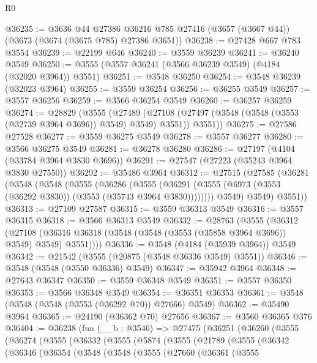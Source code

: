 \begin{lexlean}{R0}
\begin{coremodule}
@36235 := @3636
    @44
    @27386
    @36216
    @785
    @27416
    (@3657 (@3667 @44))
    (@3673 (@3674 (@3675 @785) @27386 @3651))
@36238 := @27428 @667 @783 @3554
@36239 := @22199 @646
@36240 := @3559 @36239
@36241 := @36240 @3549
@36250 := @3555 (@3557 @36241 (@3566 @36239 @3549) (@4184 (@32020 @3964)) @3551)
@36251 := @3548 @36250
@36254 := @3548 @36239 (@32023 @3964)
@36255 := @3559 @36254
@36256 := @36255 @3549
@36257 := @3557 @36256
@36259 := @3566 @36254 @3549
@36260 := @36257 @36259
@36274 := @28829
    (@3555
      (@27489
        (@27108 (@27497 (@3548 (@3548 (@3553 (@32739 @3964 @3696)) @3549) @3549) @3551))
        @3551))
@36275 := @27586 @27528
@36277 := @3559 @36275 @3549
@36278 := @3557 @36277
@36280 := @3566 @36275 @3549
@36281 := @36278 @36280
@36286 := @27197 (@4104 (@33784 @3964 @3830 @3696))
@36291 := @27547 (@27223 (@35243 @3964 @3830 @27550))
@36292 := @35486 @3964
@36312 := @27515
    (@27585
      (@36281
        (@3548
          (@3548
            (@3555
              (@36286
                (@3555
                  (@36291 (@3555 (@6973 (@3553 (@36292 @3830)) (@3553 (@35743 @3964 @3830))))))))
            @3549)
          @3549)
        @3551))
@36313 := @27109 @27587
@36315 := @3559 @36313 @3549
@36316 := @3557 @36315
@36318 := @3566 @36313 @3549
@36332 := @28763
    (@3555
      (@36312
        (@27108 (@36316 @36318 (@3548 (@3548 (@3553 (@35858 @3964 @3696)) @3549) @3549) @3551))))
@36336 := @3548 (@4184 (@35939 @3964)) @3549
@36342 := @21542 (@3555 (@20875 (@3548 @36336 @3549) @3551))
@36346 := @3548 (@3548 (@3550 @36336) @3549)
@36347 := @35942 @3964
@36348 := @27643 @36347
@36350 := @3559 @36348 @3549
@36351 := @3557 @36350
@36353 := @3566 @36348 @3549
@36354 := @36351 @36353
@36361 := @3548 (@3548 (@3548 (@3553 (@36292 @70)) @27666) @3549)
@36362 := @35490 @3964
@36365 := @24190 (@36362 @70) @27656
@36367 := @3560 @36365 @376
@36404 := @36238
    (fun (__b : @3546) =>
    @27475
      (@36251
        (@36260
          (@3555
            (@36274
              (@3555
                (@36332
                  (@3555
                    (@5874
                      (@3555
                        (@21789
                          (@3555
                            (@36342
                              (@36346
                                (@36354
                                  (@3548
                                    (@3548
                                      (@3555
                                        (@27660
                                          (@36361
                                            (@3555

\end{coremodule}
\end{lexlean}

